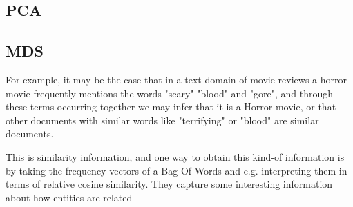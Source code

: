 




\subsection{PCA}

\subsection{MDS}


For example, it may be the case that in a text domain of movie reviews a horror movie frequently mentions the words "scary" "blood" and "gore", and through these terms occurring together we may infer that it is a Horror movie, or that other documents with similar words like "terrifying" or "blood" are similar documents.


This is similarity information, and one way to obtain this kind-of information is by taking the frequency vectors of a Bag-Of-Words and e.g. interpreting them in terms of relative cosine similarity.  They capture some interesting information about how entities are related

